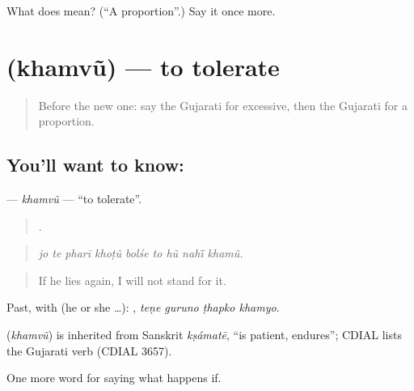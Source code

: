 \begin{tcolorbox}[breakable,colback=teal!4,colframe=teal!35!black,title={Before you move on}]
What does  mean? (\textquotedblleft{}A proportion\textquotedblright{}.) Say it once more.
\end{tcolorbox}
\section[\texorpdfstring{\gu{ખમવું} (khamvũ)}{ખમવું (khamvũ)}]{ (khamvũ) — to tolerate}

\label{lesson:GU-C378-khamvu}



\begin{quote}
Before the new one: say the Gujarati for excessive, then the Gujarati for a proportion.
\end{quote}

\subsection*{You'll want to know: }
\textbf{} — \emph{khamvũ} — \textquotedblleft{}to tolerate\textquotedblright{}.

\begin{quote}
        .
\end{quote}

\begin{quote}
\emph{jo te pharī khoṭũ bolśe to hũ nahī̃ khamũ.}
\end{quote}

\begin{quote}
If he lies again, I will not stand for it.
\end{quote}

Past, with  (he or she …):    , \emph{teṇe guruno ṭhapko khamyo}.

\begin{cousinweb}
\textbf{} (\emph{khamvũ}) is inherited from Sanskrit \emph{kṣámatē}, \textquotedblleft{}is patient, endures\textquotedblright{}; CDIAL lists the Gujarati verb (CDIAL 3657).
\end{cousinweb}

\begin{grammarlens}[title={What you've built}]
One more word for saying what happens if.
\end{grammarlens}

